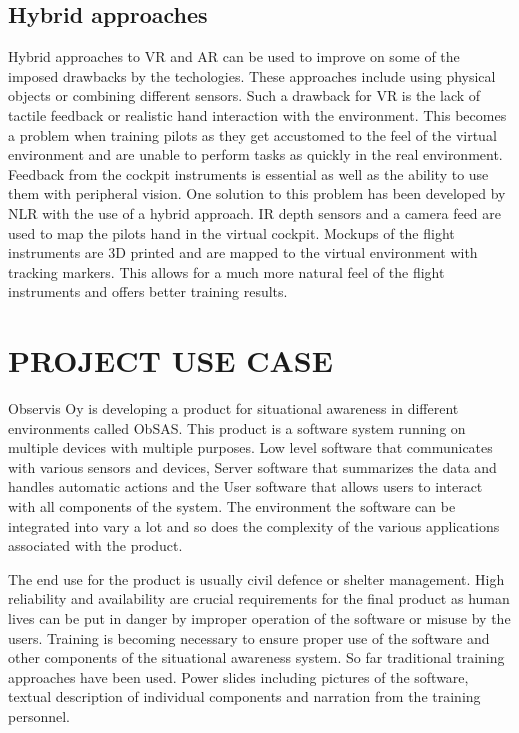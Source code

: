 \documentclass[12pt, a4paper,oneside, nocenter]{thesis}
\begin{document}
\section{Hybrid approaches}
\par
Hybrid approaches to VR and AR can be used to improve on some of the imposed drawbacks by the techologies. These approaches include using physical objects or combining different sensors.
Such a drawback for VR is the lack of tactile feedback or realistic hand interaction with the environment. This becomes a problem when training pilots as they get accustomed to the feel of the virtual environment and are unable to perform tasks as quickly in the real environment.
Feedback from the cockpit instruments is essential as well as the ability to use them with peripheral vision.
One solution to this problem has been developed by NLR with the use of a hybrid approach.
IR depth sensors and a camera feed are used to map the pilots hand in the virtual cockpit. Mockups of the flight instruments are 3D printed and are mapped to the virtual environment with tracking markers.
This allows for a much more natural feel of the flight instruments and offers better training results\citep{nlr-vr}.
\par

\par
\chapter{\MakeUppercase{Project use case}}
Observis Oy is developing a product for situational awareness in different environments called ObSAS.
This product is a software system running on multiple devices with multiple purposes.
Low level software that communicates with various sensors and devices, Server software
that summarizes the data and handles automatic actions and the User software that allows users to interact
with all components of the system. The environment the software can be integrated 
into vary a lot and so does 
the complexity of the various applications associated with the product.
\par
The end use for the product is usually civil defence or shelter management.
High reliability and availability are crucial requirements for the final product as 
human lives can be put in danger by improper operation of the software or misuse by
the users. Training is becoming necessary to ensure proper use of the software and 
other components of the situational awareness system. So far traditional training 
approaches have been used. Power slides including pictures of the software, textual description of individual components and narration from the training personnel.
\par
\end{document}
